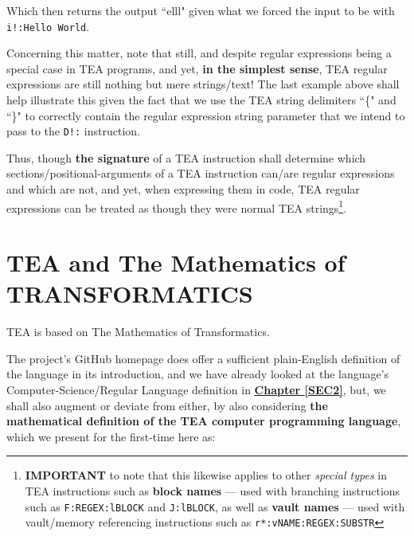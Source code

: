 \documentclass[a4paper, 18pt]{book} %
\begin{document}
Which then returns the output ``elll" given what we forced the input to be with \texttt{i!:Hello World}.

Concerning this matter, note that still, and despite regular expressions being a special case in TEA programs, and yet, \textbf{in the simplest sense}, TEA regular expressions are still nothing but mere strings/text! The last example above shall help illustrate this given the fact that we use the TEA string delimiters ``\{" and ``\}" to correctly contain the regular expression string parameter that we intend to pass to the \texttt{D!:} instruction.

Thus, though \textbf{the signature} of a TEA instruction shall determine which sections/positional-arguments of a TEA instruction can/are regular expressions and which are not, and yet, when expressing them in code, TEA regular expressions can be treated as though they were normal TEA strings\footnote{\textbf{IMPORTANT} to note that this likewise applies to other \textit{special types} in TEA instructions such as \textbf{block names} --- used with branching instructions such as \texttt{F:REGEX:lBLOCK} and \texttt{J:lBLOCK}, as well as \textbf{vault names} --- used with vault/memory referencing instructions such as \texttt{r*:vNAME:REGEX:SUBSTR}}.





\chapter{TEA and The Mathematics of TRANSFORMATICS}
\label{SECTRANSFORM}


TEA is based on The Mathematics of Transformatics\cite{Lutalo2025_transformatics_thesis}. 

\vspace{1em}



The project's GitHub homepage\cite{cli_tttt} does offer a sufficient plain-English definition of the language in its introduction, and we have already looked at the language's Computer-Science/Regular Language definition in \textbf{\hyperref[SEC2]{Chapter \ref{SEC2}}}, but, we shall also augment or deviate from either, by also considering \textbf{the mathematical definition of the TEA computer programming language}, which we present for the first-time here as:\\
\end{document}
